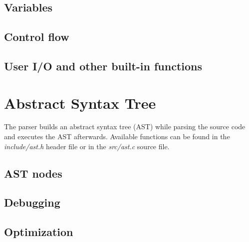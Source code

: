 \documentclass[12pt,a4paper]{scrartcl}
\begin{document}
        \subsection{Variables}
            
        \subsection{Control flow}
            
        \subsection{User I/O and other built-in functions}
            
        
    \section{Abstract Syntax Tree}
        The parser builds an abstract syntax tree (AST) while parsing the source code and
        executes the AST afterwards. Available functions can be found in the
        \textit{include/ast.h} header file or in the \textit{src/ast.c} source file.
        \subsection{AST nodes}
            
        \subsection{Debugging}
            
        \subsection{Optimization}
            



    \newpage
    \printbibliography
\end{document}
